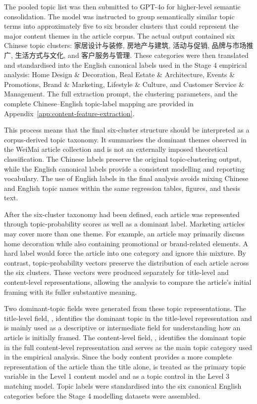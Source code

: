 The pooled topic list was then submitted to GPT-4o for higher-level semantic consolidation. The model was instructed to group semantically similar topic terms into approximately five to six broader clusters that could represent the major content themes in the article corpus. The actual output contained six Chinese topic clusters: {\cjkfont 家居设计与装修}, {\cjkfont 房地产与建筑}, {\cjkfont 活动与促销}, {\cjkfont 品牌与市场推广}, {\cjkfont 生活方式与文化}, and {\cjkfont 客户服务与管理}. These categories were then translated and standardised into the English canonical labels used in the Stage 4 empirical analysis: Home Design \& Decoration, Real Estate \& Architecture, Events \& Promotions, Brand \& Marketing, Lifestyle \& Culture, and Customer Service \& Management. The full extraction prompt, the clustering parameters, and the complete Chinese--English topic-label mapping are provided in Appendix~\ref{app:content-feature-extraction}.

This process means that the final six-cluster structure should be interpreted as a corpus-derived topic taxonomy. It summarises the dominant themes observed in the WeiMai article collection and is not an externally imposed theoretical classification. The Chinese labels preserve the original topic-clustering output, while the English canonical labels provide a consistent modelling and reporting vocabulary. The use of English labels in the final analysis avoids mixing Chinese and English topic names within the same regression tables, figures, and thesis text.

After the six-cluster taxonomy had been defined, each article was represented through topic-probability scores as well as a dominant label. Marketing articles may cover more than one theme. For example, an article may primarily discuss home decoration while also containing promotional or brand-related elements. A hard label would force the article into one category and ignore this mixture. By contrast, topic-probability vectors preserve the distribution of each article across the six clusters. These vectors were produced separately for title-level and content-level representations, allowing the analysis to compare the article’s initial framing with its fuller substantive meaning.

Two dominant-topic fields were generated from these topic representations. The title-level field, , identifies the dominant topic in the title-level representation and is mainly used as a descriptive or intermediate field for understanding how an article is initially framed. The content-level field, , identifies the dominant topic in the full content-level representation and serves as the main topic category used in the empirical analysis. Since the body content provides a more complete representation of the article than the title alone,  is treated as the primary topic variable in the Level 1 content model and as a topic control in the Level 3 matching model. Topic labels were standardised into the six canonical English categories before the Stage 4 modelling datasets were assembled.

